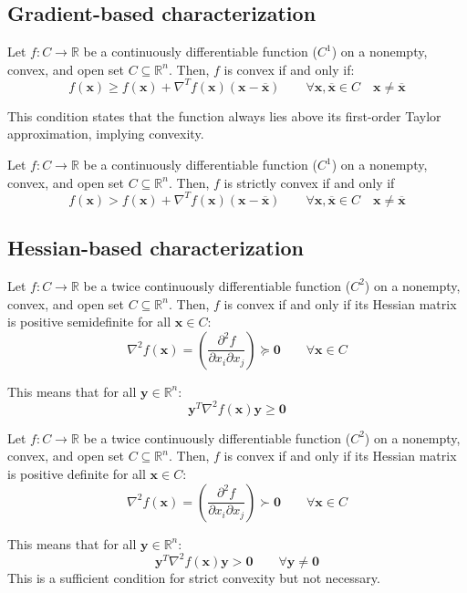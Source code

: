 \subsection{Gradient-based characterization}
\begin{proposition}
    Let $f : C \rightarrow\mathbb{R}$ be a continuously differentiable function ($C^1$) on a nonempty, convex, and open set $C \subseteq\mathbb{R}^n$. 
    Then, $f$ is convex if and only if:
    \[f(\mathbf{x}) \geq f (\mathbf{x}) +  \nabla ^T f (\mathbf{x})(\mathbf{x}-\overline{\mathbf{x}}) \qquad\forall \mathbf{x},\overline{\mathbf{x}} \in C\quad \mathbf{x}\neq\overline{\mathbf{x}}\]
\end{proposition}
\noindent This condition states that the function always lies above its first-order Taylor approximation, implying convexity.
\begin{proposition}
    Let $f : C \rightarrow\mathbb{R}$ be a continuously differentiable function ($C^1$) on a nonempty, convex, and open set $C \subseteq\mathbb{R}^n$. 
    Then, $f$ is strictly convex if and only if
    \[f(\mathbf{x}) > f (\mathbf{x}) +  \nabla ^T f (\mathbf{x})(\mathbf{x}-\overline{\mathbf{x}}) \qquad\forall \mathbf{x},\overline{\mathbf{x}} \in C\quad \mathbf{x}\neq\overline{\mathbf{x}}\]
\end{proposition}

\subsection{Hessian-based characterization}
\begin{proposition}
    Let $f : C \rightarrow\mathbb{R}$ be a twice continuously differentiable function ($C^2$) on a nonempty, convex, and open set $C \subseteq\mathbb{R}^n$. 
    Then, $f$  is convex if and only if its Hessian matrix is positive semidefinite for all $\mathbf{x}\in C$: 
    \[\nabla^2 f(\mathbf{x}) = \left( \frac{\partial^2f}{\partial x_i \partial x_j }\right)\succeq \mathbf{0}\qquad\forall\mathbf{x}\in C\]
\end{proposition}
\noindent This means that for all $\mathbf{y}\in\mathbb{R}^n$: 
\[\mathbf{y}^T\nabla^2f(\mathbf{x})\mathbf{y}\geq\mathbf{0}\]
\begin{proposition}
    Let $f : C \rightarrow\mathbb{R}$ be a twice continuously differentiable function ($C^2$) on a nonempty, convex, and open set $C \subseteq\mathbb{R}^n$. 
    Then, $f$  is convex if and only if its Hessian matrix is positive definite for all $\mathbf{x}\in C$: 
    \[\nabla^2 f(\mathbf{x}) = \left( \frac{\partial^2f}{\partial x_i \partial x_j }\right)\succ \mathbf{0}\qquad\forall\mathbf{x}\in C\]
\end{proposition}
\noindent This means that for all $\mathbf{y}\in\mathbb{R}^n$: 
\[\mathbf{y}^T\nabla^2f(\mathbf{x})\mathbf{y}>\mathbf{0}\qquad\forall\mathbf{y}\neq\mathbf{0}\]
This is a sufficient condition for strict convexity but not necessary.

